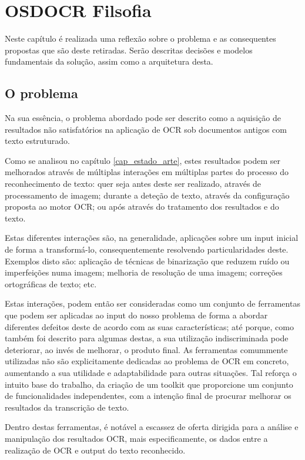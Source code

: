 \chapter{OSDOCR Filsofia}
\label{cap_osdocr_filosofia}

Neste capítulo é realizada uma reflexão sobre o problema e as consequentes propostas que são deste retiradas. Serão descritas decisões e modelos fundamentais da solução, assim como a arquitetura desta. 

\section{O problema}

Na sua essência, o problema abordado pode ser descrito como a aquisição de resultados não satisfatórios na aplicação de OCR sob documentos antigos com texto estruturado. 

Como se analisou no capítulo \ref{cap_estado_arte}, estes resultados podem ser melhorados através de múltiplas interações em múltiplas partes do processo do reconhecimento de texto: quer seja antes deste ser realizado, através de processamento de imagem; durante a deteção de texto, através da configuração proposta ao motor OCR; ou após através do tratamento dos resultados e do texto.

Estas diferentes interações são, na generalidade, aplicações sobre um input inicial de forma a transformá-lo, consequentemente resolvendo particularidades deste. Exemplos disto são: aplicação de técnicas de binarização que reduzem ruído ou imperfeições numa imagem; melhoria de resolução de uma imagem; correções ortográficas de texto; etc. 

Estas interações, podem então ser consideradas como um conjunto de ferramentas que podem ser aplicadas ao input do nosso problema de forma a abordar diferentes defeitos deste de acordo com as suas características; até porque, como também foi descrito para algumas destas, a sua utilização indiscriminada pode deteriorar, ao invés de melhorar, o produto final. As ferramentas comummente utilizadas não são explicitamente dedicadas ao problema de OCR em concreto, aumentando a sua utilidade e adaptabilidade para outras situações.
Tal reforça o intuito base do trabalho, da criação de um toolkit que proporcione um conjunto de funcionalidades independentes, com a intenção final de procurar melhorar os resultados da transcrição de texto.

Dentro destas ferramentas, é notável a escassez de oferta dirigida para a análise e manipulação dos resultados OCR, mais especificamente, os dados entre a realização de OCR e output do texto reconhecido.

